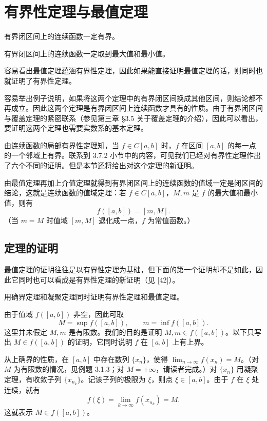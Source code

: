 \section{有界性定理与最值定理}

\begin{xproposition}[5.3.1（有界性定理）]
有界闭区间上的连续函数一定有界。
\end{xproposition}

\begin{xproposition}[5.3.2（最值定理）]
有界闭区间上的连续函数一定取到最大值和最小值。
\end{xproposition}

\begin{xremark}
容易看出最值定理蕴涵有界性定理，因此如果能直接证明最值定理的话，则同时也就证明了有界性定理。
\end{xremark}

\begin{xremark}
容易举出例子说明，如果将这两个定理中的有界闭区间换成其他区间，则结论都不再成立。因此这两个定理是有界闭区间上连续函数才具有的性质。由于有界闭区间与覆盖定理的紧密联系（参见第三章 §3.5 关于覆盖定理的介绍），因此可以看出，要证明这两个定理也需要实数系的基本定理。
\end{xremark}

\begin{xremark}
由连续函数的局部有界性定理知，当 $f\in C[a,b]$ 时，$f$ 在区间 $[a,b]$ 的每一点的一个邻域上有界。联系到 3.7.2 小节中的内容，可见我们已经对有界性定理作出了六个不同的证明。但是本节还将给出对这个定理的新证明。
\end{xremark}

\begin{xremark}
由最值定理再加上介值定理就得到有界闭区间上的连续函数的值域一定是闭区间的结论，这就是连续函数的值域定理：若 $f\in C[a,b]$，$M,m$ 是 $f$ 的最大值和最小值，则有
\[
  f([a,b])=[m,M].
\]
（当 $m=M$ 时值域 $[m,M]$ 退化成一点，$f$ 为常值函数。）
\end{xremark}

\subsection{定理的证明}

最值定理的证明往往是以有界性定理为基础，但下面的第一个证明却不是如此，因此它同时也可以看成是有界性定理的新证明（见 [42]）。

\begin{xexample}[5.3.1]
用确界定理和凝聚定理同时证明有界性定理和最值定理。
\end{xexample}
\begin{xproof}
由于值域 $f([a,b])$ 非空，因此可取
\[
  M=\sup f([a,b]),\qquad m=\inf f([a,b]).
\]
这里并未假定 $M,m$ 是有限数。我们的目的是证明 $M,m\in f([a,b])$。以下只写出 $M\in f([a,b])$ 的证明，它同时说明 $f$ 在 $[a,b]$ 上有上界。

从上确界的性质，在 $[a,b]$ 中存在数列 $\{x_n\}$，使得 $\lim_{n\to\infty}f(x_n)=M$。（对 $M$ 为有限数的情况，见例题 3.1.3；对 $M=+\infty$，请读者完成。）对 $\{x_n\}$ 用凝聚定理，有收敛子列 $\{x_{n_k}\}$。记该子列的极限为 $\xi$，则点 $\xi\in[a,b]$。由于 $f$ 在 $\xi$ 处连续，就有
\[
  f(\xi)=\lim_{k\to\infty}f(x_{n_k})=M.
\]
这就表示 $M\in f([a,b])$。
\end{xproof}

